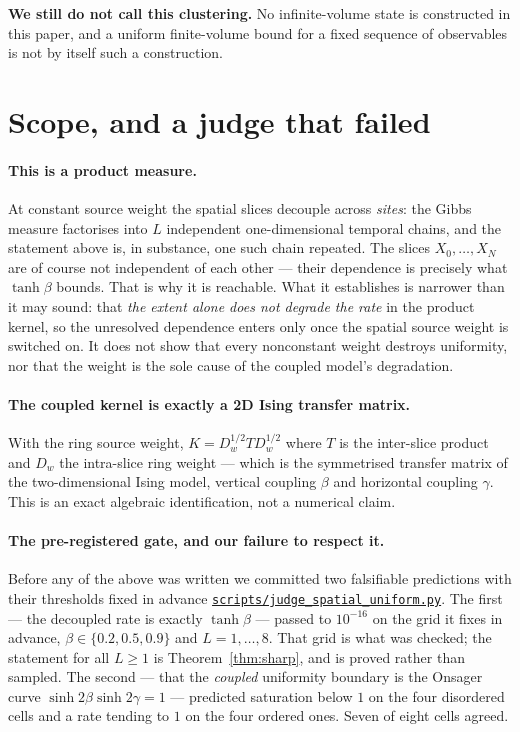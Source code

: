 \documentclass[11pt]{article}
\theoremstyle{definition}
\newcommand{\anchor}{247de2b31c8b2b6edb2cffe5fd6d96d6aa5c8a7a}
\newcommand{\repofile}[2]{%
  \href{https://github.com/lluiseriksson/THE-ERIKSSON-PROGRAMME/blob/\anchor/#1}{\nolinkurl{#2}}}
\begin{document}
\textbf{We still do not call this clustering.}  No infinite-volume state is
constructed in this paper, and a uniform finite-volume bound for a fixed
sequence of observables is not by itself such a construction.

\section{Scope, and a judge that failed}\label{sec:scope}

\paragraph{This is a product measure.}  At constant source weight the spatial
slices decouple across \emph{sites}: the Gibbs measure factorises into $L$
independent one-dimensional temporal chains, and the statement above is, in
substance, one such chain repeated.  The slices $X_0,\dots,X_N$ are of course
not independent of each other --- their dependence is precisely what
$\tanh\beta$ bounds.  That is
why it is reachable.  What it establishes is narrower than it may sound: that
\emph{the extent alone does not degrade the rate} in the product kernel, so the
unresolved dependence enters only once the spatial source weight is switched on.
It does not show that every nonconstant weight destroys uniformity, nor that the
weight is the sole cause of the coupled model's degradation.

\paragraph{The coupled kernel is exactly a 2D Ising transfer matrix.}  With the
ring source weight, $K = D_w^{1/2} T D_w^{1/2}$ where $T$ is the inter-slice
product and $D_w$ the intra-slice ring weight --- which is the symmetrised
transfer matrix of the two-dimensional Ising model, vertical coupling $\beta$
and horizontal coupling $\gamma$.  This is an exact algebraic identification,
not a numerical claim.

\paragraph{The pre-registered gate, and our failure to respect it.}  Before any
of the above was written we committed two falsifiable predictions with their
thresholds fixed in advance
\repofile{scripts/judge\_spatial\_uniform.py}{scripts/judge\_spatial\_uniform.py}.
The first --- the decoupled rate is exactly $\tanh\beta$ --- passed to
$10^{-16}$ on the grid it fixes in advance, $\beta\in\{0.2,0.5,0.9\}$ and
$L=1,\dots,8$.  That grid is what was checked; the statement for all $L\ge1$ is
Theorem~\ref{thm:sharp}, and is proved rather than sampled.  The second --- that the \emph{coupled} uniformity boundary
is the Onsager curve $\sinh 2\beta \sinh 2\gamma = 1$ --- predicted saturation
below $1$ on the four disordered cells and a rate tending to $1$ on the four
ordered ones.  Seven of eight cells agreed.
\end{document}
